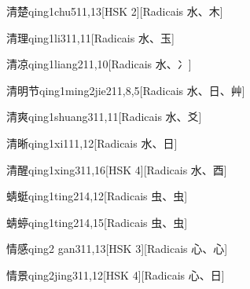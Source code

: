 \begin{entry}{清楚}{qing1chu5}{11,13}[HSK 2][Radicais ⽔、⽊]
\end{entry}

\begin{entry}{清理}{qing1li3}{11,11}[Radicais ⽔、⽟]
\end{entry}

\begin{entry}{清凉}{qing1liang2}{11,10}[Radicais ⽔、⼎]
\end{entry}

\begin{entry}{清明节}{qing1ming2jie2}{11,8,5}[Radicais ⽔、⽇、⾋]
\end{entry}

\begin{entry}{清爽}{qing1shuang3}{11,11}[Radicais ⽔、⽘]
\end{entry}

\begin{entry}{清晰}{qing1xi1}{11,12}[Radicais ⽔、⽇]
\end{entry}

\begin{entry}{清醒}{qing1xing3}{11,16}[HSK 4][Radicais ⽔、⾣]
\end{entry}

\begin{entry}{蜻蜓}{qing1ting2}{14,12}[Radicais ⾍、⾍]
\end{entry}

\begin{entry}{蜻蝏}{qing1ting2}{14,15}[Radicais ⾍、⾍]
\end{entry}

\begin{entry}{情感}{qing2 gan3}{11,13}[HSK 3][Radicais ⼼、⼼]
\end{entry}

\begin{entry}{情景}{qing2jing3}{11,12}[HSK 4][Radicais ⼼、⽇]
\end{entry}

